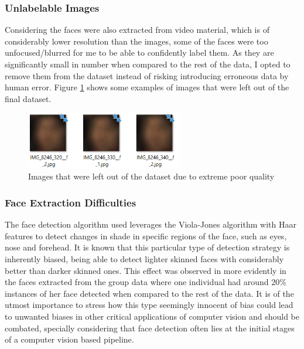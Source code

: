 \documentclass[11pt]{article}
\begin{document}
        \subsubsection{Unlabelable Images}
            Considering the faces were also extracted from video material, which is of considerably lower resolution than the images, some of the faces were too unfocused/blurred for me to be able to confidently label them. As they are significantly small in number when compared to the rest of the data, I opted to remove them from the dataset instead of risking introducing erroneous data by human error. Figure \ref{fig:label:blurry} shows some examples of images that were left out of the final dataset.
            \begin{figure}[ht]
                \centering
                \includegraphics[height=2.5cm]{./Images/labeling/blurry.png}
                \caption{Images that were left out of the dataset due to extreme poor quality}
                \label{fig:label:blurry}
            \end{figure}

        \subsubsection{Face Extraction Difficulties}
            The face detection algorithm used leverages the Viola-Jones algorithm with Haar features to detect changes in shade in specific regions of the face, such as eyes, nose and forehead. It is known that this particular type of detection strategy is inherently biased\cite{gender_shades}, being able to detect lighter skinned faces with considerably better than darker skinned ones. This effect was observed in more evidently in the faces extracted from the group data where one individual had around 20\% instances of her face detected when compared to the rest of the data. It is of the utmost importance to stress how this type seemingly innocent of bias could lead to unwanted biases in other critical applications of computer vision and should be combated, specially considering that face detection often lies at the initial stages of a computer vision based pipeline.
\end{document}
